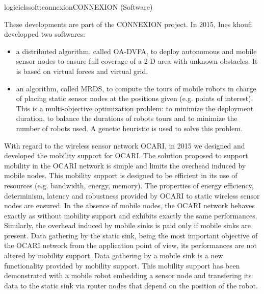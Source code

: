 \documentclass{ra2016}
\begin{document}
\begin{module}{logiciels}{soft:connexion}{CONNEXION (Software)} 

\begin{participants}
\end{participants}

These developments are part of the CONNEXION project. 
In 2015, Ines khoufi developped two softwares:

\begin{itemize}
    \item a distributed algorithm, called OA-DVFA, to deploy autonomous and mobile sensor nodes to ensure full coverage of a 2-D area with unknown obstacles. It is based on virtual forces and virtual grid.
    \item an algorithm, called MRDS, to compute the tours of mobile robots in charge of placing static sensor nodes at the positions given (e.g. points of interest). This is a multi-objective optimization problem: to minimize the deployment duration, to balance the durations of robots tours and to minimize the number of robots used. A genetic heuristic is used to solve this problem. 
\end{itemize}

With regard to the wireless sensor network OCARI, in 2015 we designed and developed the mobility support for OCARI.
The solution proposed to support mobility in the OCARI network is simple and limits the overhead induced by mobile nodes. This mobility support is designed to be efficient in its use of resources (e.g. bandwidth, energy, memory). The properties of energy efficiency, determinism, latency and robustness provided by OCARI to static wireless sensor nodes are ensured. In the absence of mobile nodes, the OCARI network behaves exactly as without mobility support and exhibits exactly the same performances. 
Similarly, the overhead induced by mobile sinks is paid only if mobile sinks are present. Data gathering by the static sink, being the most important objective of the OCARI network from the application point of view, its performances are not altered by mobility support. Data gathering by a mobile sink is a new functionality provided by mobility support. This mobility support has been demonstrated with a mobile robot embedding a sensor node and transfering its data to the static sink via router nodes that depend on the position of the robot.


\end{module}
\end{document}
